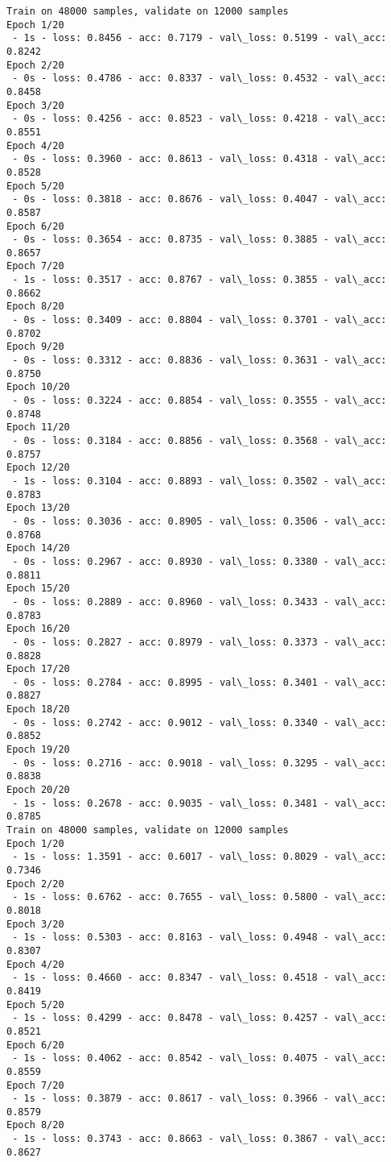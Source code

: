 \documentclass[11pt]{article}
\begin{document}
    \begin{Verbatim}[commandchars=\\\{\}]
Train on 48000 samples, validate on 12000 samples
Epoch 1/20
 - 1s - loss: 0.8456 - acc: 0.7179 - val\_loss: 0.5199 - val\_acc: 0.8242
Epoch 2/20
 - 0s - loss: 0.4786 - acc: 0.8337 - val\_loss: 0.4532 - val\_acc: 0.8458
Epoch 3/20
 - 0s - loss: 0.4256 - acc: 0.8523 - val\_loss: 0.4218 - val\_acc: 0.8551
Epoch 4/20
 - 0s - loss: 0.3960 - acc: 0.8613 - val\_loss: 0.4318 - val\_acc: 0.8528
Epoch 5/20
 - 0s - loss: 0.3818 - acc: 0.8676 - val\_loss: 0.4047 - val\_acc: 0.8587
Epoch 6/20
 - 0s - loss: 0.3654 - acc: 0.8735 - val\_loss: 0.3885 - val\_acc: 0.8657
Epoch 7/20
 - 1s - loss: 0.3517 - acc: 0.8767 - val\_loss: 0.3855 - val\_acc: 0.8662
Epoch 8/20
 - 0s - loss: 0.3409 - acc: 0.8804 - val\_loss: 0.3701 - val\_acc: 0.8702
Epoch 9/20
 - 0s - loss: 0.3312 - acc: 0.8836 - val\_loss: 0.3631 - val\_acc: 0.8750
Epoch 10/20
 - 0s - loss: 0.3224 - acc: 0.8854 - val\_loss: 0.3555 - val\_acc: 0.8748
Epoch 11/20
 - 0s - loss: 0.3184 - acc: 0.8856 - val\_loss: 0.3568 - val\_acc: 0.8757
Epoch 12/20
 - 1s - loss: 0.3104 - acc: 0.8893 - val\_loss: 0.3502 - val\_acc: 0.8783
Epoch 13/20
 - 0s - loss: 0.3036 - acc: 0.8905 - val\_loss: 0.3506 - val\_acc: 0.8768
Epoch 14/20
 - 0s - loss: 0.2967 - acc: 0.8930 - val\_loss: 0.3380 - val\_acc: 0.8811
Epoch 15/20
 - 0s - loss: 0.2889 - acc: 0.8960 - val\_loss: 0.3433 - val\_acc: 0.8783
Epoch 16/20
 - 0s - loss: 0.2827 - acc: 0.8979 - val\_loss: 0.3373 - val\_acc: 0.8828
Epoch 17/20
 - 0s - loss: 0.2784 - acc: 0.8995 - val\_loss: 0.3401 - val\_acc: 0.8827
Epoch 18/20
 - 0s - loss: 0.2742 - acc: 0.9012 - val\_loss: 0.3340 - val\_acc: 0.8852
Epoch 19/20
 - 0s - loss: 0.2716 - acc: 0.9018 - val\_loss: 0.3295 - val\_acc: 0.8838
Epoch 20/20
 - 1s - loss: 0.2678 - acc: 0.9035 - val\_loss: 0.3481 - val\_acc: 0.8785
Train on 48000 samples, validate on 12000 samples
Epoch 1/20
 - 1s - loss: 1.3591 - acc: 0.6017 - val\_loss: 0.8029 - val\_acc: 0.7346
Epoch 2/20
 - 1s - loss: 0.6762 - acc: 0.7655 - val\_loss: 0.5800 - val\_acc: 0.8018
Epoch 3/20
 - 1s - loss: 0.5303 - acc: 0.8163 - val\_loss: 0.4948 - val\_acc: 0.8307
Epoch 4/20
 - 1s - loss: 0.4660 - acc: 0.8347 - val\_loss: 0.4518 - val\_acc: 0.8419
Epoch 5/20
 - 1s - loss: 0.4299 - acc: 0.8478 - val\_loss: 0.4257 - val\_acc: 0.8521
Epoch 6/20
 - 1s - loss: 0.4062 - acc: 0.8542 - val\_loss: 0.4075 - val\_acc: 0.8559
Epoch 7/20
 - 1s - loss: 0.3879 - acc: 0.8617 - val\_loss: 0.3966 - val\_acc: 0.8579
Epoch 8/20
 - 1s - loss: 0.3743 - acc: 0.8663 - val\_loss: 0.3867 - val\_acc: 0.8627

\end{Verbatim}
\end{document}
